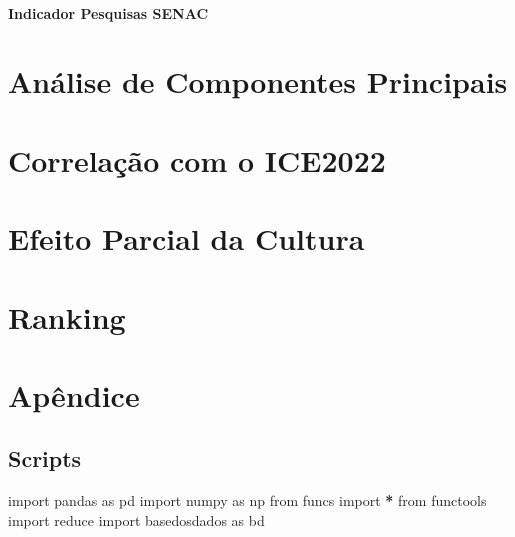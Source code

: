 \documentclass[
  12,
  dvipsnames]{article}
\newenvironment{Shaded}{\begin{snugshade}}{\end{snugshade}}
\newcommand{\BuiltInTok}[1]{#1}
\newcommand{\ImportTok}[1]{#1}
\newcommand{\NormalTok}[1]{#1}
\newcommand{\OperatorTok}[1]{\textcolor[rgb]{0.81,0.36,0.00}{\textbf{#1}}}
\begin{document}
\hypertarget{indicador-pesquisas-senac}{%
\paragraph{Indicador Pesquisas SENAC}\label{indicador-pesquisas-senac}}

\hypertarget{anuxe1lise-de-componentes-principais}{%
\section{Análise de Componentes
Principais}\label{anuxe1lise-de-componentes-principais}}

\hypertarget{correlauxe7uxe3o-com-o-ice2022}{%
\section{Correlação com o
ICE2022}\label{correlauxe7uxe3o-com-o-ice2022}}

\hypertarget{efeito-parcial-da-cultura}{%
\section{Efeito Parcial da Cultura}\label{efeito-parcial-da-cultura}}

\hypertarget{ranking}{%
\section{Ranking}\label{ranking}}

\hypertarget{apend}{%
\section*{Apêndice}\label{apend}}

\hypertarget{script_ind}{%
\subsection*{Scripts}\label{script_ind}}

\begin{Shaded}
\begin{Highlighting}[]
\ImportTok{import}\NormalTok{ pandas }\ImportTok{as}\NormalTok{ pd}
\ImportTok{import}\NormalTok{ numpy }\ImportTok{as}\NormalTok{ np}
\ImportTok{from}\NormalTok{ funcs }\ImportTok{import} \OperatorTok{*}
\ImportTok{from}\NormalTok{ functools }\ImportTok{import} \BuiltInTok{reduce}
\ImportTok{import}\NormalTok{ basedosdados }\ImportTok{as}\NormalTok{ bd}
\end{Highlighting}
\end{Shaded}
\end{document}
